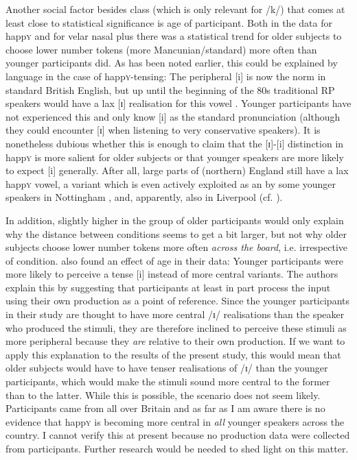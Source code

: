 Another social factor besides class (which is only relevant for /k/) that comes at least close to statistical significance is age of participant.
Both in the data for happ\textsc{y} and for velar nasal plus there was a statistical trend for older subjects to choose lower number tokens (more Mancunian/standard) more often than younger participants did.
As has been noted earlier, this could be explained by language  in the case of happ\textsc{y}-tensing: The peripheral [i] is now the norm in standard British English, but up until the beginning of the 80s traditional RP speakers would have a lax [ɪ] realisation for this vowel \parencite[cf.][]{harrington2006}.
Younger participants have not experienced this  and only know [i] as the standard pronunciation (although they could encounter [ɪ] when listening to very conservative speakers).
It is nonetheless dubious whether this is enough to claim that the [ɪ]-[i] distinction in happ\textsc{y} is more salient for older subjects or that younger speakers are more likely to expect [i] generally.
After all, large parts of (northern) England still have a lax happ\textsc{y} vowel, a variant which is even actively exploited as an   by some younger speakers in Nottingham \parencite[cf.][]{flynn2010}, and, apparently, also in Liverpool (cf. ).

In addition, slightly higher  in the group of older participants would only explain why the distance between  conditions seems to get a bit larger, but not why older subjects choose lower number tokens more often \emph{across the board}, i.e. irrespective of  condition.
\textcite[878--879]{haydrager2010} also found an effect of age in their data: Younger participants were more likely to perceive a tense [i] instead of more central variants.
The authors explain this by suggesting that participants at least in part process the input using their own production as a point of reference.
Since the younger participants in their study are thought to have more central /ɪ/ realisations than the speaker who produced the stimuli, they are therefore inclined to perceive these stimuli as more peripheral because they \emph{are} relative to their own production.
If we want to apply this explanation to the results of the present study, this would mean that older subjects would have to have tenser realisations of /ɪ/ than the younger participants, which would make the stimuli sound more central to the former than to the latter.
While this is possible, the scenario does not seem likely.
Participants came from all over Britain and as far as I am aware there is no evidence that happ\textsc{y} is becoming more central in \emph{all} younger speakers across the country.
I cannot verify this at present because no production data were collected from participants.
Further research would be needed to shed light on this matter.

